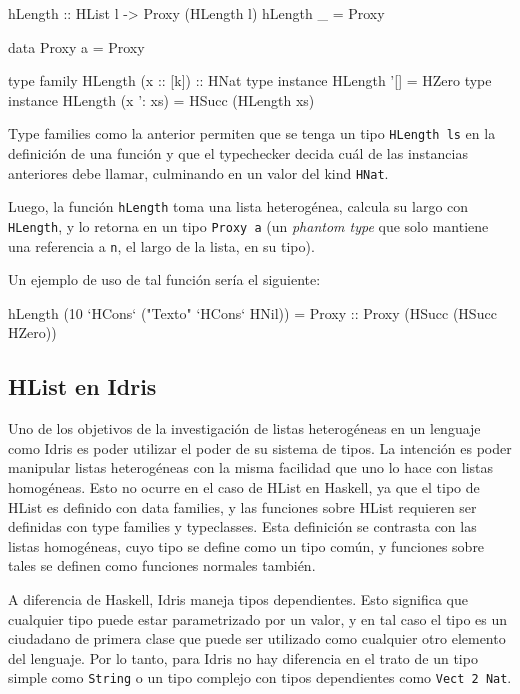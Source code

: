 \begin{code}
hLength :: HList l -> Proxy (HLength l)
hLength _ = Proxy

data Proxy a = Proxy

type family HLength (x :: [k]) :: HNat
type instance HLength '[] = HZero
type instance HLength (x ': xs) = HSucc (HLength xs)
\end{code}

Type families como la anterior permiten que se tenga un tipo \texttt{HLength ls} en la definición de una función y que el typechecker decida cuál de las instancias anteriores debe llamar, culminando en un valor del kind \texttt{HNat}.

Luego, la función \texttt{hLength} toma una lista heterogénea, calcula su largo con \texttt{HLength}, y lo retorna en un tipo \texttt{Proxy a} (un \textit{phantom type} que solo mantiene una referencia a \texttt{n}, el largo de la lista, en su tipo).

Un ejemplo de uso de tal función sería el siguiente:

\begin{code}
hLength (10 `HCons` ("Texto" `HCons` HNil)) = 
  Proxy :: Proxy (HSucc (HSucc HZero))
\end{code}

\subsection{HList en Idris}

Uno de los objetivos de la investigación de listas heterogéneas en un lenguaje como Idris es poder utilizar el poder de su sistema de tipos. La intención es poder manipular listas heterogéneas con la misma facilidad que uno lo hace con listas homogéneas. Esto no ocurre en el caso de HList en Haskell, ya que el tipo de HList es definido con data families, y las funciones sobre HList requieren ser definidas con type families y typeclasses. Esta definición se contrasta con las listas homogéneas, cuyo tipo se define como un tipo común, y funciones sobre tales se definen como funciones normales también.

A diferencia de Haskell, Idris maneja tipos dependientes. Esto significa que cualquier tipo puede estar parametrizado por un valor, y en tal caso el tipo es un ciudadano de primera clase que puede ser utilizado como cualquier otro elemento del lenguaje. Por lo tanto, para Idris no hay diferencia en el trato de un tipo simple como \texttt{String} o un tipo complejo con tipos dependientes como \texttt{Vect 2 Nat}.

